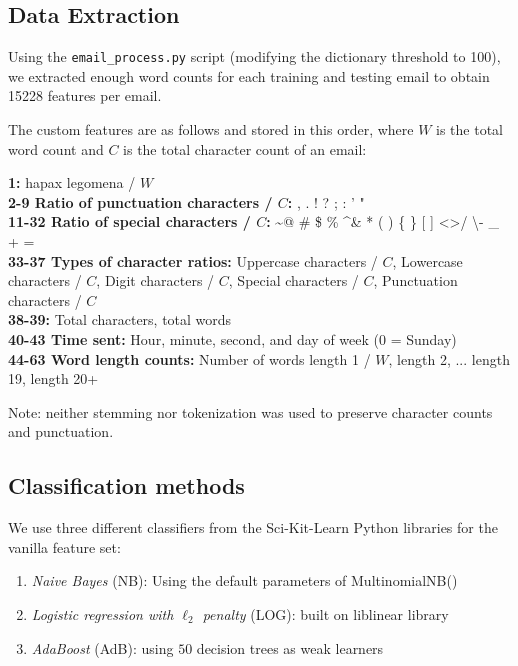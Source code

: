 \documentclass{article} %
\begin{document}
\subsection*{Data Extraction}
\par
Using the  \lstinline{email_process.py}\lstinline{} script (modifying the dictionary threshold to 100), we extracted enough word counts for each training and testing email to obtain 15228 features per email.\par 
The custom features are as follows and stored in this order, where $W$ is the total word count and $C$ is the total character count of an email:\cite{abbasi2008writeprints} \par 
\textbf{1:} hapax legomena / $W$\\
\textbf{2-9 Ratio of punctuation characters / $C$: }  , . ! ? ; : ' "\\
\textbf{11-32 Ratio of special characters / $C$:} \textasciitilde @ \# \$ \% \textasciicircum \& * ( ) \{ \} [ ] \textless \textgreater / \textbackslash - \_ + =\\
\textbf{33-37 Types of character ratios:} Uppercase characters / $C$, Lowercase characters / $C$, Digit characters / $C$, Special characters / $C$, Punctuation characters / $C$\\
\textbf{38-39:} Total characters, total words\\
\textbf{40-43 Time sent: } Hour, minute, second, and day of week (0 = Sunday)\\
\textbf{44-63 Word length counts:} Number of words length 1 / $W$, length 2, ... length 19, length 20+

Note: neither stemming nor tokenization was used to preserve character counts and punctuation.
\subsection{Classification methods}

We use three different classifiers from the Sci-Kit-Learn Python libraries for the vanilla feature set: \cite{scikit-learn}
\begin{enumerate}
\item \emph{Naive Bayes} (NB): Using the default parameters of MultinomialNB()
\item \emph{Logistic regression with $\ell_2$ penalty} (LOG): built on liblinear library
\item \emph{AdaBoost} (AdB): using $50$ decision trees as weak learners
\end{enumerate}
\end{document}
